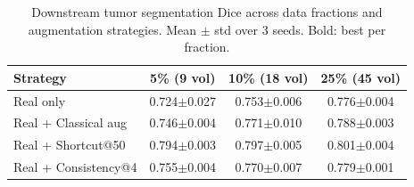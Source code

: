 \begin{table}[t]
\centering
\caption{Downstream tumor segmentation Dice across data fractions and augmentation strategies. Mean $\pm$ std over 3 seeds. Bold: best per fraction.}
\label{tab:downstream}
\footnotesize
\begin{tabular}{lccc}
\toprule
Strategy & 5\% (9 vol) & 10\% (18 vol) & 25\% (45 vol) \\
\midrule
  Real only & 0.724$\pm$0.027 & 0.753$\pm$0.006 & 0.776$\pm$0.004 \\
  Real + Classical aug & 0.746$\pm$0.004 & 0.771$\pm$0.010 & 0.788$\pm$0.003 \\
  Real + Shortcut@50 & 0.794$\pm$0.003 & 0.797$\pm$0.005 & 0.801$\pm$0.004 \\
  Real + Consistency@4 & 0.755$\pm$0.004 & 0.770$\pm$0.007 & 0.779$\pm$0.001 \\
\bottomrule
\end{tabular}
\end{table}